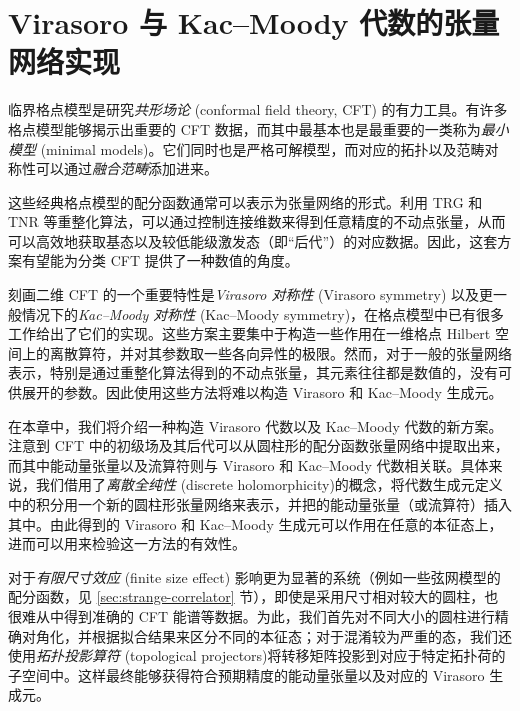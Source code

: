 \chapter{Virasoro 与 Kac--Moody 代数的张量网络实现}
\label{chap:virasoro}

临界格点模型是研究\emph{共形场论} (conformal field theory, CFT) 的有力工具。有许多格点模型能够揭示出重要的 CFT 数据，而其中最基本也是最重要的一类称为\emph{最小模型} (minimal models)。它们同时也是严格可解模型，而对应的拓扑以及范畴对称性可以通过\emph{融合范畴}添加进来\cite{vanhove2018mapping,aasen2020topological,huang2022numerical,vanhove2022critical}。

这些经典格点模型的配分函数通常可以表示为张量网络的形式。利用 TRG 和 TNR 等重整化算法\cite{levin2007tensor,evenbly2015tensor1}，可以通过控制连接维数来得到任意精度的不动点张量，从而可以高效地获取基态以及较低能级激发态（即“后代”）的对应数据。因此，这套方案有望能为分类 CFT 提供了一种数值的角度。

刻画二维 CFT 的一个重要特性是\emph{Virasoro 对称性} (Virasoro symmetry) 以及更一般情况下的\emph{Kac--Moody 对称性} (Kac--Moody symmetry)，在格点模型中已有很多工作给出了它们的实现\cite{pasquier1990common,koo1994representations,milsted2017extraction,zou2018conformal,hongler2022conformal,wang2022emergence}。这些方案主要集中于构造一些作用在一维格点 Hilbert 空间上的离散算符，并对其参数取一些各向异性的极限。然而，对于一般的张量网络表示，特别是通过重整化算法得到的不动点张量，其元素往往都是数值的，没有可供展开的参数。因此使用这些方法将难以构造 Virasoro 和 Kac--Moody 生成元。

在本章中，我们将介绍一种构造 Virasoro 代数以及 Kac--Moody 代数的新方案\cite{wang2022virasoro,zeng2023virasoro}。注意到 CFT 中的初级场及其后代可以从圆柱形的配分函数张量网络中提取出来\cite{hauru2016topological}，而其中能动量张量以及流算符则与 Virasoro 和 Kac--Moody 代数相关联。具体来说，我们借用了\emph{离散全纯性} (discrete holomorphicity)\cite{cardy2009discrete}的概念，将代数生成元定义中的积分用一个新的圆柱形张量网络来表示，并把的能动量张量（或流算符）插入其中。由此得到的 Virasoro 和 Kac--Moody 生成元可以作用在任意的本征态上，进而可以用来检验这一方法的有效性。

对于\emph{有限尺寸效应} (finite size effect) 影响更为显著的系统（例如一些弦网模型的配分函数，见 \ref{sec:strange-correlator} 节），即使是采用尺寸相对较大的圆柱，也很难从中得到准确的 CFT 能谱等数据。为此，我们首先对不同大小的圆柱进行精确对角化，并根据拟合结果来区分不同的本征态；对于混淆较为严重的态，我们还使用\emph{拓扑投影算符} (topological projectors)\cite{bultinck2017anyons,williamson2017symmetry,aasen2020topological}将转移矩阵投影到对应于特定拓扑荷的子空间中。这样最终能够获得符合预期精度的能动量张量以及对应的 Virasoro 生成元。

